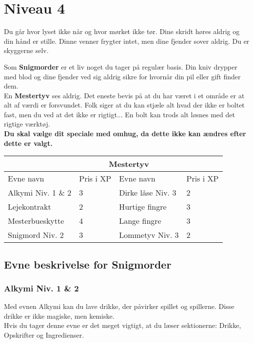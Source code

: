 \chapter{Niveau 4}

Du går hvor lyset ikke når og hvor mørket ikke tør. Dine skridt høres aldrig og din hånd er stille. Dinne venner frygter intet, men dine fjender sover aldrig. Du er skyggerne selv.


Som \textbf{Snigmorder} er et liv noget du tager på regulær basis. Din kniv drypper med blod og dine fjender ved sig aldrig sikre for hvornår din pil eller gift finder dem.\\

En \textbf{Mestertyv} ses aldrig. Det eneste bevis på at du har været i et område er at alt af værdi er forsvundet. Folk siger at du kan stjæle alt hvad der ikke er boltet fast, men du ved at det ikke er rigtigt... En bolt kan trods alt løsnes med det rigtige værktøj.\\

\textbf{Du skal vælge dit speciale med omhug, da dette ikke kan ændres efter dette er valgt.}\\

\begin{tabular}{|p{}|p{}|p{}|p{}|}
\hline
\rowcolor{cerulean!80}
 \multicolumn{2}{|c|}{  Snigmorder } & \multicolumn{2}{|c|}{ Mestertyv }\\
\hline
\rowcolor{cerulean!40}
    Evne navn & Pris i XP & Evne navn & Pris i XP\\ \hline
    Alkymi Niv. 1 \& 2 & 3 & Dirke låse Niv. 3 & 2 \\ \hline
    Lejekontrakt & 2 & Hurtige fingre & 3\\\hline
    Mesterbueskytte & 4 & Lange fingre & 3\\\hline
    Snigmord Niv. 2 & 3 & Lommetyv Niv. 3 & 2\\
\hline
\end{tabular}

\section{Evne beskrivelse for Snigmorder}

\subsection{Alkymi Niv. 1 \& 2}
Med evnen Alkymi kan du lave drikke, der påvirker spillet og spillerne. Disse drikke er ikke magiske, men kemiske.\\
Hvis du tager denne evne er det meget vigtigt, at du læser sektionerne: Drikke, Opskrifter og Ingredienser.

